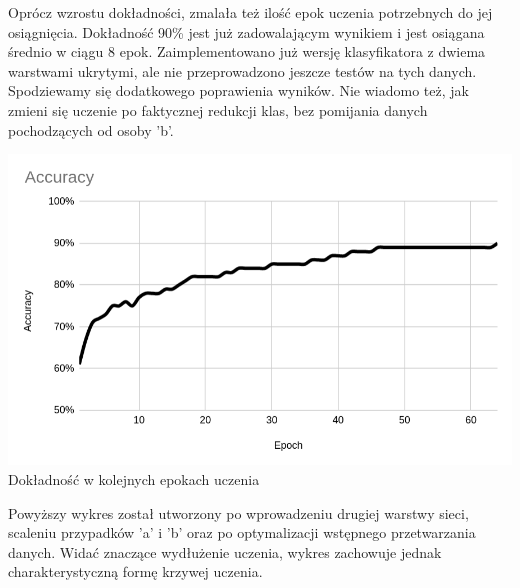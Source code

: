 \documentclass[a4paper,12pt]{article}
\begin{document}
\hspace{1cm}Oprócz wzrostu dokładności, zmalała też ilość epok uczenia potrzebnych do jej osiągnięcia. Dokładność 90\% jest już zadowalającym wynikiem i jest osiągana średnio w ciągu 8 epok. Zaimplementowano już wersję klasyfikatora z dwiema warstwami ukrytymi, ale nie przeprowadzono jeszcze testów na tych danych. Spodziewamy się dodatkowego poprawienia wyników. Nie wiadomo też, jak zmieni się uczenie po faktycznej redukcji klas, bez pomijania danych pochodzących od osoby 'b'.

\begin{center}
	\includegraphics[scale=0.4]{accuracy3.png}
	\\\small Dokładność w kolejnych epokach uczenia
\end{center}

\hspace{1cm}Powyższy wykres został utworzony po wprowadzeniu drugiej warstwy sieci, scaleniu przypadków 'a' i 'b' oraz po optymalizacji wstępnego przetwarzania danych. Widać znaczące wydłużenie uczenia, wykres zachowuje jednak charakterystyczną formę krzywej uczenia.
\end{document}
